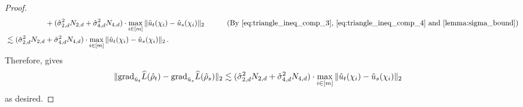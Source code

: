 \begin{proof}
\begin{align}
& \nextlinespace\nextlinespace + (\sigmaCoeffTwo^2 N_{2, d} + \sigmaCoeffFour^2 N_{4, d}) \cdot \max_{i \in [m]} \|\uhat_t(\chi_i) - \uhat_s(\chi_i)\|_2
& \tag{By \Cref{eq:triangle_ineq_comp_3}, \Cref{eq:triangle_ineq_comp_4} and \Cref{lemma:sigma_bound}} \\
& \lesssim (\sigmaCoeffTwo^2 N_{2, d} + \sigmaCoeffFour^2 N_{4, d}) \cdot \max_{i \in [m]} \|\uhat_t(\chi_i) - \uhat_s(\chi_i)\|_2 \period
\end{align}
Therefore,  gives
\begin{align}
\|{\textup{grad}}_{\hat{u}_t}\widehat{L}({\hat{\rho}}_t) - {\textup{grad}}_{\hat{u}_s} \widehat{L}({\hat{\rho}}_s)\|_2
& \lesssim (\hat{\sigma}_{2, d}^2 N_{2, d} + \hat{\sigma}_{4, d}^2 N_{4, d}) \cdot \max_{i \in [m]} \|\hat{u}_t(\chi_i) - \hat{u}_s(\chi_i)\|_2
\end{align}
as desired.
\end{proof}


